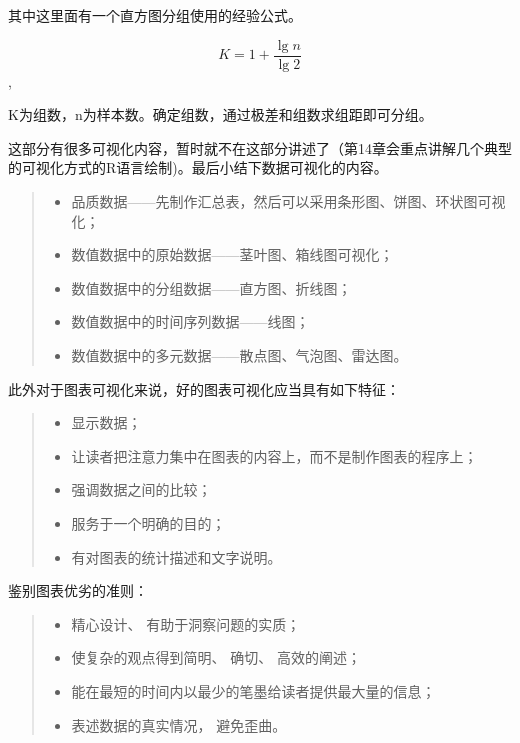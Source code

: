 \documentclass[]{ctexbook}
\providecommand{\tightlist}{%
  \setlength{\itemsep}{0pt}\setlength{\parskip}{0pt}}
\begin{document}
其中这里面有一个直方图分组使用的经验公式。

\[K=1+\frac{\lg {n}}{\lg {2}}\],

K为组数，n为样本数。确定组数，通过极差和组数求组距即可分组。

这部分有很多可视化内容，暂时就不在这部分讲述了（第14章会重点讲解几个典型的可视化方式的R语言绘制)。最后小结下数据可视化的内容。

\begin{quote}
\begin{itemize}
\tightlist
\item
  品质数据------先制作汇总表，然后可以采用条形图、饼图、环状图可视化；
\item
  数值数据中的原始数据------茎叶图、箱线图可视化；
\item
  数值数据中的分组数据------直方图、折线图；
\item
  数值数据中的时间序列数据------线图；
\item
  数值数据中的多元数据------散点图、气泡图、雷达图。
\end{itemize}
\end{quote}

此外对于图表可视化来说，好的图表可视化应当具有如下特征：

\begin{quote}
\begin{itemize}
\tightlist
\item
  显示数据；
\item
  让读者把注意力集中在图表的内容上，而不是制作图表的程序上；
\item
  强调数据之间的比较；
\item
  服务于一个明确的目的；
\item
  有对图表的统计描述和文字说明。
\end{itemize}
\end{quote}

鉴别图表优劣的准则：

\begin{quote}
\begin{itemize}
\tightlist
\item
  精心设计、 有助于洞察问题的实质；
\item
  使复杂的观点得到简明、 确切、 高效的阐述；
\item
  能在最短的时间内以最少的笔墨给读者提供最大量的信息；
\item
  表述数据的真实情况， 避免歪曲。
\end{itemize}
\end{quote}
\end{document}
